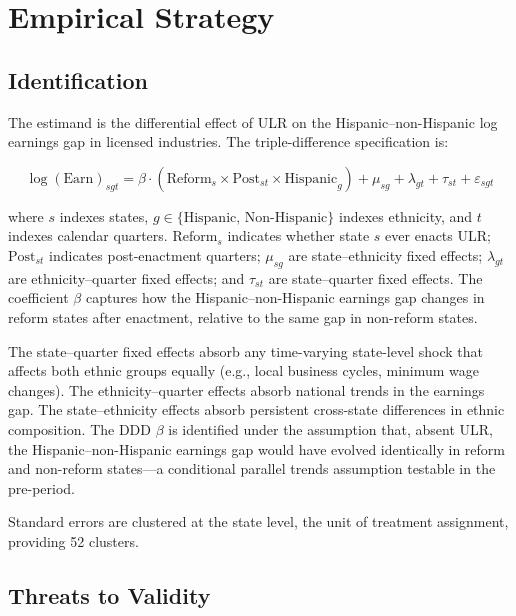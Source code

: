 \documentclass[12pt]{article}
\begin{document}
\section{Empirical Strategy}

\subsection{Identification}

The estimand is the differential effect of ULR on the Hispanic--non-Hispanic log earnings gap in licensed industries. The triple-difference specification is:

\begin{equation}
\log(\text{Earn})_{sgt} = \beta \cdot (\text{Reform}_s \times \text{Post}_{st} \times \text{Hispanic}_g) + \mu_{sg} + \lambda_{gt} + \tau_{st} + \varepsilon_{sgt}
\label{eq:ddd}
\end{equation}

\noindent where $s$ indexes states, $g \in \{\text{Hispanic, Non-Hispanic}\}$ indexes ethnicity, and $t$ indexes calendar quarters. $\text{Reform}_s$ indicates whether state $s$ ever enacts ULR; $\text{Post}_{st}$ indicates post-enactment quarters; $\mu_{sg}$ are state--ethnicity fixed effects; $\lambda_{gt}$ are ethnicity--quarter fixed effects; and $\tau_{st}$ are state--quarter fixed effects. The coefficient $\beta$ captures how the Hispanic--non-Hispanic earnings gap changes in reform states after enactment, relative to the same gap in non-reform states.

The state--quarter fixed effects absorb any time-varying state-level shock that affects both ethnic groups equally (e.g., local business cycles, minimum wage changes). The ethnicity--quarter effects absorb national trends in the earnings gap. The state--ethnicity effects absorb persistent cross-state differences in ethnic composition. The DDD $\beta$ is identified under the assumption that, absent ULR, the Hispanic--non-Hispanic earnings gap would have evolved identically in reform and non-reform states---a conditional parallel trends assumption testable in the pre-period.

Standard errors are clustered at the state level, the unit of treatment assignment, providing 52 clusters.

\subsection{Threats to Validity}
\end{document}
